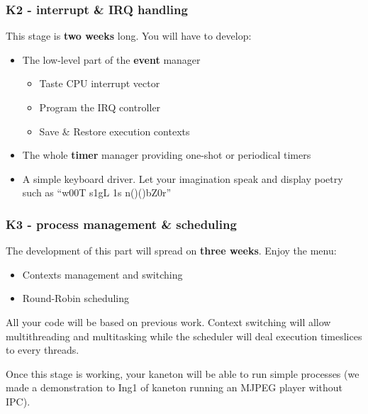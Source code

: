 
\begin{frame}
  \frametitle{K2 - interrupt \& IRQ handling}

  This stage is \textbf{two weeks} long. You will have to develop:

  \begin{itemize}
  \item The low-level part of the \textbf{event} manager
    \begin{itemize}
    \item Taste CPU interrupt vector
    \item Program the IRQ controller
    \item Save \& Restore execution contexts
    \end{itemize}
  \item The whole \textbf{timer} manager providing one-shot or periodical timers
  \item A simple keyboard driver. Let your imagination speak and display poetry such as ``w00T s1gL 1s n()()bZ0r''
  \end{itemize}
\end{frame}


\begin{frame}
  \frametitle{K3 - process management \& scheduling}

  The development of this part will spread on \textbf{three
  weeks}. Enjoy the menu:

  \begin{itemize}
  \item
    Contexts management and switching
  \item
    Round-Robin scheduling
  \end{itemize}

  \-

  All your code will be based on previous work. Context switching will
  allow multithreading and multitasking while the scheduler will deal
  execution timeslices to every threads.

  \-

  Once this stage is working, your kaneton will be able to run simple
  processes (we made a demonstration to Ing1 of kaneton running an
  MJPEG player without IPC).

\end{frame}


